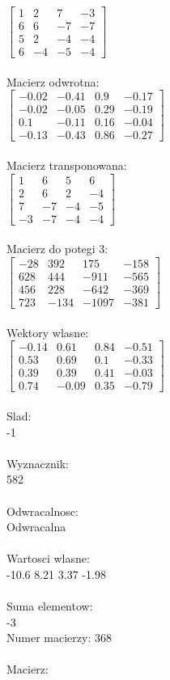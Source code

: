 \documentclass[a4paper,12pt]{article}
\begin{document}
$\begin{bmatrix} 1&2&7&-3\\6&6&-7&-7\\5&2&-4&-4\\6&-4&-5&-4 \end{bmatrix}$
\\
\\
Macierz odwrotna:\\

$\begin{bmatrix} -0.02&-0.41&0.9&-0.17\\-0.02&-0.05&0.29&-0.19\\0.1&-0.11&0.16&-0.04\\-0.13&-0.43&0.86&-0.27 \end{bmatrix}$
\\
\\
Macierz transponowana:\\

$\begin{bmatrix} 1&6&5&6\\2&6&2&-4\\7&-7&-4&-5\\-3&-7&-4&-4 \end{bmatrix}$
\\
\\
Macierz do potegi 3:\\

$\begin{bmatrix} -28&392&175&-158\\628&444&-911&-565\\456&228&-642&-369\\723&-134&-1097&-381 \end{bmatrix}$
\\
\\
Wektory wlasne:\\

$\begin{bmatrix} -0.14&0.61&0.84&-0.51\\0.53&0.69&0.1&-0.33\\0.39&0.39&0.41&-0.03\\0.74&-0.09&0.35&-0.79 \end{bmatrix}$
\\
\\
Slad:\\
-1
\\
\\
Wyznacznik:\\
582
\\
\\
Odwracalnosc:\\
Odwracalna
\\
\\
Wartosci wlasne:\\
-10.6 8.21 3.37 -1.98
\\
\\
Suma elementow:\\
-3
\\
\newpage
Numer macierzy:
368
\\
\\
Macierz:\\
\end{document}
